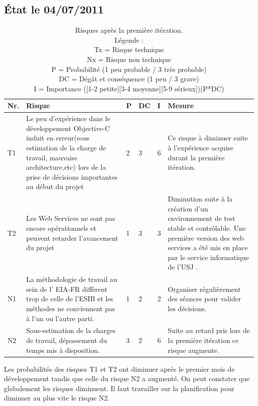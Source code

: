 	\subsection{État le 04/07/2011  }
	\begin{table}[H]
	\begin{tabular}{|l|p{6cm}|l|l|l|p{6cm}|}
		\hline  Nr. & Risque & P  & DC & I & Mesure \\ 
		\hline  {\color{green}T1} & Le peu d'expérience dans le développement \gls{Objective-C} induit en erreur(sous estimation de la charge de travail, mauvaise architecture,etc) lors de la prise de décisions importantes au début du projet & 2 & 3 & 6 & Ce risque à diminuer suite à l'expérience acquise durant la première itération.  \\ 
		\hline  {\color{green}T2} & Les Web Services ne sont pas encore opérationnels et peuvent retarder l'avancement du projet & 1 & 3 & 3 & Diminution suite à la création d'un environnement de test stable et contrôlable. Une première version des web services a été mis en place par le service informatique de l'\gls{USJ}  .  \\ 
		\hline  N1 & La méthodologie de travail au sein de l' \gls{EIA-FR} diffèrent trop de celle de l'\gls{ESIB}  et les méthodes ne conviennent pas à l'un ou l'autre parti.  & 1 & 2 & 2 & Organiser régulièrement des séances pour valider les décisions.  \\ 
		\hline  {\color{red}N2} & Sous-estimation de la charges de travail, dépassement du temps mis à disposition.  & 3 & 2 & 6 & Suite au retard pris lors de la première itération ce risque augmente.  \\ 
		
		\hline 
	\end{tabular} 
	\caption{ Risques après la première itération.\\ Légende :\\
Tx = Risque technique\\
Nx = Risque non technique\\
P = Probabilité  (1 peu probable / 3 très probable)\\ 
DC = Dégât et conséquence (1 peu / 3 grave)\\
I =  Importance ([1-2 petite][3-4 moyenne][5-9 sérieux])(P*DC)
}
	\end{table}
Les probabilités des risques T1 et T2  ont diminuer après le premier mois de développement tandis que celle du risque N2 a augmenté. On peut constater que globalement les risques diminuent. Il faut travailler sur la planification pour diminuer au plus vite le risque N2.

